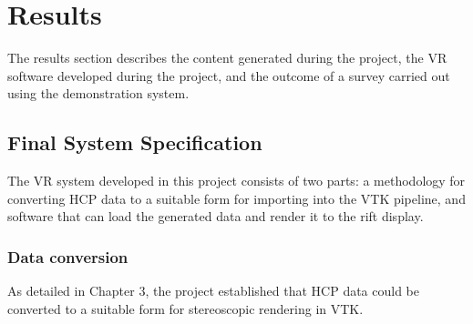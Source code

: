 \documentclass[MSc,paper=a4,pagesize=auto]{icldt}
\begin{document}
\chapter{Results}
The results section describes the content generated during the project, the VR software developed during the project, and the outcome of a survey carried out using the demonstration system.

\section{Final System Specification}
The VR system developed in this project consists of two parts: a methodology for converting HCP data to a suitable form for importing into the VTK pipeline, and software that can load the generated data and render it to the rift display. 

\subsection{Data conversion}
As detailed in Chapter 3, the project established that HCP data could be converted to a suitable form for stereoscopic rendering in VTK. 
\end{document}
